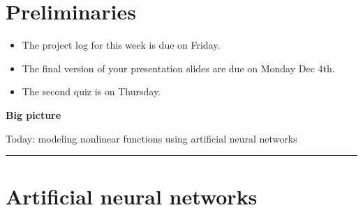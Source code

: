 \documentclass[12pt,letterpaper,noanswers]{exam}
\begin{document}
 \pdfpageheight 11in 
  \pdfpagewidth 8.5in

\noindent 

\section*{Preliminaries}


\begin{itemize}
\itemsep0pt
\item The project log for this week is due on Friday.
\item The final version of your presentation slides are due on Monday Dec 4th.
\item The second quiz is on Thursday.
\end{itemize}


\noindent\textbf{Big picture}

Today: modeling nonlinear functions using artificial neural networks

\vspace{0.2cm}
\hrule
\vspace{0.2cm}

\section*{Artificial neural networks}
\end{document}
